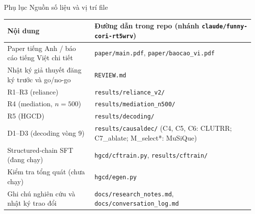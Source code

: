 \documentclass[aspectratio=169,t]{beamer}
\newcommand{\code}[1]{\texttt{#1}}
\begin{document}
\begin{frame}[shrink]{Phụ lục \textperiodcentered{} Nguồn số liệu và vị trí file}
\scriptsize
\renewcommand{\arraystretch}{1.18}
\begin{tabularx}{\textwidth}{@{}P{4.4cm}Y@{}}
\toprule
\textbf{Nội dung} & \textbf{Đường dẫn trong repo (nhánh \code{claude/funny-cori-rt5wrv})}\\
\midrule
Paper tiếng Anh / báo cáo tiếng Việt chi tiết & \code{paper/main.pdf}, \code{paper/baocao\_vi.pdf}\\
Nhật ký giả thuyết đăng ký trước và go/no-go & \code{REVIEW.md}\\
R1--R3 (reliance) & \code{results/reliance\_v2/}\\
R4 (mediation, $n=500$) & \code{results/mediation\_n500/}\\
R5 (HGCD) & \code{results/decoding/}\\
D1--D3 (decoding vòng 9) & \code{results/causaldec/} (C4, C5, C6: CLUTRR; C7\_ablate; M\_select*: MuSiQue)\\
Structured-chain SFT (đang chạy) & \code{hgcd/cftrain.py}, \code{results/cftrain/}\\
Kiểm tra tổng quát (chưa chạy) & \code{hgcd/egen.py}\\
Ghi chú nghiên cứu và nhật ký trao đổi & \code{docs/research\_notes.md}, \code{docs/conversation\_log.md}\\
\bottomrule
\end{tabularx}
\par\kern0pt
\end{frame}
\end{document}

